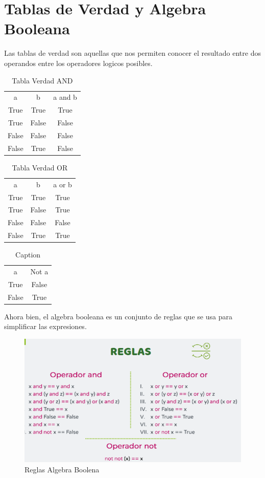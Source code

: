 \documentclass{article}
\begin{document}
\section{Tablas de Verdad y Algebra Booleana}
Las tablas de verdad son aquellas que nos permiten conocer el resultado entre dos operandos entre los operadores logicos posibles.
\begin{table}[H]
    \centering
    \begin{tabular}{ccc}
        a & b & a and b\\
        True & True & True\\
        True & False & False\\
        False & False & False\\
        False & True & False\\
    \end{tabular}
    \caption{Tabla Verdad AND}
    \label{tab:my_label}
\end{table}
\begin{table}[H]
    \centering
    \begin{tabular}{ccc}
        a & b & a or b\\
        True & True & True\\
        True & False & True\\
        False & False & False\\
        False & True & True\\
    \end{tabular}
    \caption{Tabla Verdad OR}
    \label{tab:my_label}
\end{table}
\begin{table}[H]
    \centering
    \begin{tabular}{cc}
        a & Not a\\
        True & False\\
        False & True\\
    \end{tabular}
    \caption{Caption}
    \label{tab:my_label}
\end{table}
Ahora bien, el algebra booleana es un conjunto de reglas que se usa para simplificar las expresiones.
\begin{figure}[H]
    \centering
    \includegraphics[width=1\linewidth]{ReglasAlgebraBooleana.png}
    \caption{Reglas Algebra Boolena}
    \label{fig:enter-label}
\end{figure}
\end{document}
